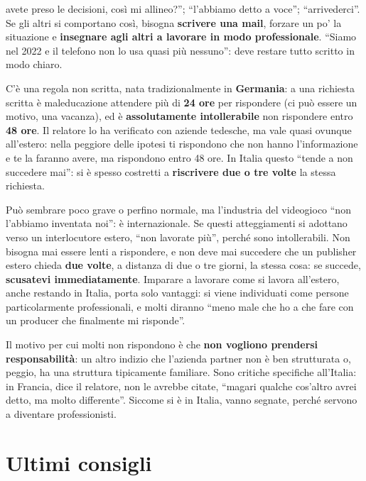 \begin{description}
        avete preso le decisioni, così mi allineo?''; ``l'abbiamo detto a
        voce''; ``arrivederci''. Se gli altri si comportano così, bisogna
        \textbf{scrivere una mail}, forzare un po' la situazione e
        \textbf{insegnare agli altri a lavorare in modo professionale}. ``Siamo
        nel 2022 e il telefono non lo usa quasi più nessuno'': deve restare
        tutto scritto in modo chiaro.
  \item[Risposte lente.] C'è una regola non scritta, nata tradizionalmente in
        \textbf{Germania}: a una richiesta scritta è maleducazione attendere più
        di \textbf{24 ore} per rispondere (ci può essere un motivo, una vacanza),
        ed è \textbf{assolutamente intollerabile} non rispondere entro
        \textbf{48 ore}. Il relatore lo ha verificato con aziende tedesche, ma
        vale quasi ovunque all'estero: nella peggiore delle ipotesi ti
        rispondono che non hanno l'informazione e te la faranno avere, ma
        rispondono entro 48 ore. In Italia questo ``tende a non succedere mai'':
        si è spesso costretti a \textbf{riscrivere due o tre volte} la stessa
        richiesta.
\end{description}
Può sembrare poco grave o perfino normale, ma l'industria del videogioco ``non
l'abbiamo inventata noi'': è internazionale. Se questi atteggiamenti si adottano
verso un interlocutore estero, ``non lavorate più'', perché sono
intollerabili. Non bisogna mai essere lenti a rispondere, e non deve mai
succedere che un publisher estero chieda \textbf{due volte}, a distanza di due o
tre giorni, la stessa cosa: se succede, \textbf{scusatevi immediatamente}.
Imparare a lavorare come si lavora all'estero, anche restando in Italia, porta
solo vantaggi: si viene individuati come persone particolarmente professionali,
e molti diranno ``meno male che ho a che fare con un producer che finalmente mi
risponde''.

Il motivo per cui molti non rispondono è che \textbf{non vogliono prendersi
responsabilità}: un altro indizio che l'azienda partner non è ben strutturata o,
peggio, ha una struttura tipicamente familiare. Sono critiche specifiche
all'Italia: in Francia, dice il relatore, non le avrebbe citate, ``magari
qualche cos'altro avrei detto, ma molto differente''. Siccome si è in Italia,
vanno segnate, perché servono a diventare professionisti.

\section{Ultimi consigli}
\label{sec:z5-ultimi-consigli}

